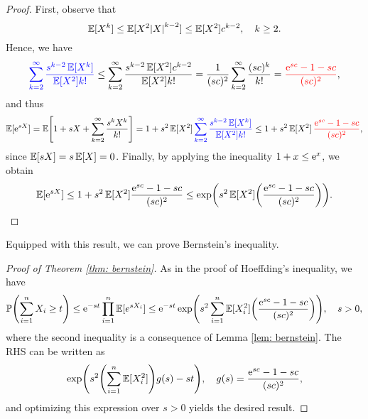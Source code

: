 \begin{proof}
First, observe that
\[
    \operatorname{\mathbb{E}}[X^k] \leq \operatorname{\mathbb{E}}[X^2 \abs{X}^{k-2}] \leq \operatorname{\mathbb{E}}[X^2] c^{k-2}, \quad k \geq 2.
\]
Hence, we have
\[
    {\color{blue} \sum_{k=2}^{\infty} \frac{s^{k-2} \operatorname{\mathbb{E}}[X^k]}{\operatorname{\mathbb{E}}[X^2] k!}} \leq \sum_{k=2}^{\infty} \frac{s^{k-2} \operatorname{\mathbb{E}}[X^2] c^{k-2}}{\operatorname{\mathbb{E}}[X^2] k!} = \frac{1}{(sc)^2} \sum_{k=2}^{\infty} \frac{(sc)^k}{k!} = {\color{red} \frac{\mathrm{e}^{sc} - 1 - sc}{(sc)^2}},
\]
and thus
\[
    \Exp[\e^{sX}] = \Exp\left[1 + sX + \sum_{k=2}^{\infty} \frac{s^k X^k}{k!}\right] = 1 + s^2 \Exp[X^2] \, {\color{blue} \sum_{k=2}^{\infty} \frac{s^{k-2} \Exp[X^k]}{\Exp[X^2] k!}} \leq 1 + s^2 \Exp[X^2] \, {\color{red} \frac{\e^{sc} - 1 - sc}{(sc)^2}},
\]
since $\operatorname{\mathbb{E}}[sX] = s \operatorname{\mathbb{E}}[X] = 0$. Finally, by applying the inequality $1 + x \leq \mathrm{e}^x$, we obtain
\[
    \Exp[\e^{sX}] \leq 1 + s^2 \Exp[X^2] \frac{\e^{sc} - 1 - sc}{(sc)^2} \leq \exp(s^2 \Exp[X^2] \left(\frac{\e^{sc} - 1 - sc}{(sc)^2} \right)). \qedhere
\]
\end{proof}

Equipped with this result, we can prove Bernstein's inequality.

\begin{proof}[Proof of Theorem \ref{thm: bernstein}]
As in the proof of Hoeffding's inequality, we have
\[
    \Prob\left(\sum_{i=1}^n X_i \geq t\right) \leq \e^{-st} \prod_{i=1}^n \Exp[e^{sX_i}] \leq \e^{-st} \exp(s^2 \sum_{i=1}^n \Exp[X_i^2] \left(\frac{\e^{sc} - 1 - sc}{(sc)^2}\right)), \quad s > 0,
\]
where the second inequality is a consequence of Lemma \ref{lem: bernstein}. The RHS can be written as
\[
    \exp(s^2 \left(\sum_{i=1}^n \Exp[X_i^2]\right) g(s) - st), \quad g(s) = \frac{\e^{sc} - 1 - sc}{(sc)^2},
\]
and optimizing this expression over $s > 0$ yields the desired result.
\end{proof}
